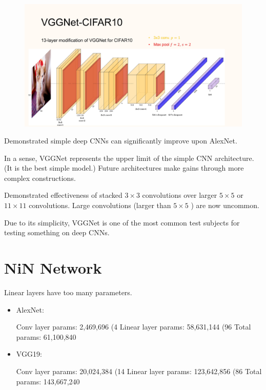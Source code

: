 \begin{definition}
    \begin{figure}[H]
        \centering
        \includegraphics[width=1.0\textwidth]{.././assets/7.9.jpg}
    \end{figure}
\end{definition}

\begin{concept}
    Demonstrated simple deep CNNs can significantly improve upon AlexNet.

    In a sense, VGGNet represents the upper limit of the simple CNN architecture. (It is the best simple model.) Future architectures make gains through more complex constructions.

    Demonstrated effectiveness of stacked $3 \times 3$ convolutions over larger $5 \times 5$ or $11 \times 11$ convolutions. Large convolutions (larger than $5 \times 5$ ) are now uncommon.

    Due to its simplicity, VGGNet is one of the most common test subjects for testing something on deep CNNs.
\end{concept}

\section{NiN Network}

\begin{concept}
    Linear layers have too many parameters.

    \begin{itemize}
        \item
        AlexNet:

        Conv layer params: 2,469,696 (4%
        Linear layer params: 58,631,144 (96%
        Total params: 61,100,840
        \item
        VGG19:

        Conv layer params: 20,024,384 (14%
        Linear layer params: 123,642,856 (86%
        Total params: 143,667,240
    \end{itemize}
\end{concept}


